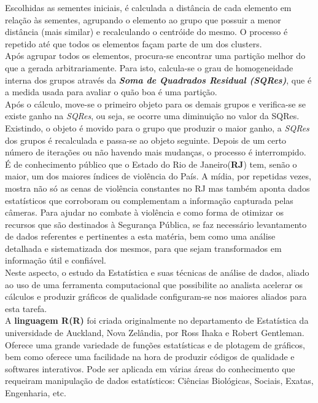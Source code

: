 \documentclass[a4paper, 12pt]{article}\usepackage[]{graphicx}\usepackage[]{color}
\begin{document}
\begin{multicols}{2}
		Escolhidas as sementes iniciais, é calculada a distância de cada elemento em relação às sementes, agrupando o elemento ao grupo que possuir a menor distância (mais similar) e recalculando o centróide do mesmo. O processo é repetido até que todos os elementos façam parte de um dos clusters.\\
		
		Após agrupar todos os elementos, procura-se encontrar uma partição melhor do que a gerada arbitrariamente. Para isto, calcula-se o grau de homogeneidade interna dos grupos através da \textit{\textbf{Soma de Quadrados Residual (SQRes)}}, que é a medida usada para avaliar o quão boa é uma partição.\\
		
		Após o cálculo, move-se o primeiro objeto para os demais grupos e verifica-se se existe ganho na \textit{SQRes}, ou seja, se ocorre uma diminuição no valor da SQRes. Existindo, o objeto é movido para o grupo que produzir o maior ganho, a \textit{SQRes} dos grupos é recalculada e passa-se ao objeto seguinte. Depois de um certo número de iterações ou não havendo mais mudanças, o processo é interrompido.\\
				
		
		É de conhecimento público que o Estado do Rio de Janeiro(\textbf{RJ}) tem, senão o maior, um dos maiores índices de violência do País.  A mídia, por repetidas vezes, mostra não só as cenas de violência constantes no RJ mas também aponta dados estatísticos que corroboram ou complementam a informação capturada pelas câmeras.   Para ajudar no combate à violência e como forma de otimizar os recursos que são destinados à Segurança Pública, se faz necessário levantamento de dados referentes e pertinentes a esta matéria, bem como uma análise detalhada e sistematizada dos mesmos, para que sejam transformados em informação útil e confiável.\\
		
		Neste aspecto, o estudo da Estatística e suas técnicas de análise de dados, aliado ao uso de uma ferramenta computacional que possibilite ao analista acelerar os cálculos e produzir gráficos de qualidade configuram-se nos maiores aliados para esta tarefa.\\
		
		A \textbf{linguagem R(R)} foi criada originalmente no departamento de Estatística da universidade de Auckland, Nova Zelândia, por Ross Ihaka e Robert Gentleman\cite{rwiki}.  Oferece uma grande variedade de funções estatísticas e de plotagem de gráficos, bem como oferece uma facilidade na hora de produzir códigos de qualidade e softwares interativos\cite{rcite2}.  Pode ser aplicada em várias áreas do conhecimento que requeiram manipulação de dados estatísticos:  Ciências Biológicas, Sociais, Exatas, Engenharia, etc. 
		

\end{multicols}
\end{document}
